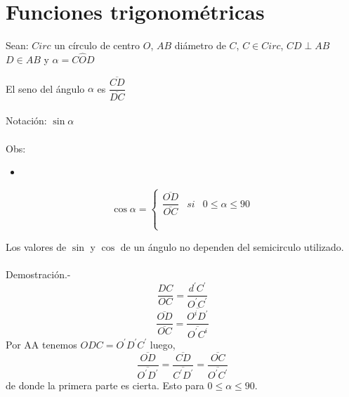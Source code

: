 \chapter{Funciones trigonométricas}

Sean: $Circ$ un círculo de centro $O$, $AB$ diámetro de $C$, $C \in Circ$, $CD \perp AB$ $D \in AB$ y $\alpha = C\widehat{O}D$

\begin{tcolorbox}[colframe = white]
    \begin{def.}
	El seno del ángulo $\alpha$ es $\dfrac{\overline{CD}}{\overline{DC}}$\\\\
	Notación: $\sin \alpha$\\\\
	Obs:
	\begin{itemize}
	    \item 
	\end{itemize}

    \end{def.}
\end{tcolorbox}

\begin{tcolorbox}[colframe = white]
    \begin{def.}
	$$\cos \alpha = \left\{\begin{array}{rcl}
		\dfrac{\overline{OD}}{\overline{OC}}&si&0 \leq \alpha \leq 90\\\\
		\\%
	    \end{array}\right.$$	
    \end{def.}
\end{tcolorbox}
    
    \begin{proposicion}
	Los valores de $\sin$ y $\cos$ de un ángulo no dependen del semicirculo utilizado.\\\\
	    Demostración.-\; $$\dfrac{DC}{OC}=\dfrac{d^{'}C^{'}}{O^{'}C^{'}}$$ $$\dfrac{\overline{OD}}{\overline{OC}}=\dfrac{\overline{O^{i}D^{'}}}{\overline{O^{'}C^{i}}}$$
	    Por AA tenemos $ODC=O^{'}D^{'}C^{'}$ luego, $$\dfrac{\overline{OD}}{\overline{O^{'}D^{'}}}=\dfrac{\overline{CD}}{\overline{C^{'}D^{'}}}=\dfrac{\overline{OC}}{\overline{O^{'}C^{'}}}$$ de donde la primera parte es cierta. Esto para $0\leq \alpha \leq 90$. 
    \end{proposicion}
